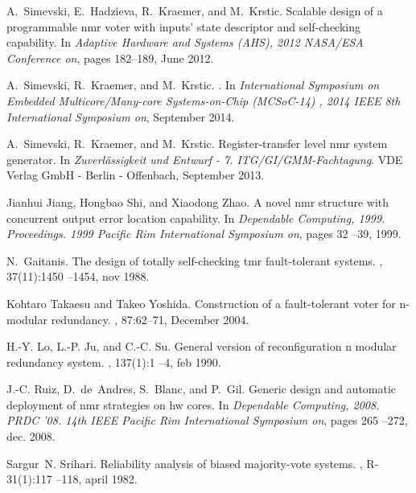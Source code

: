 \documentclass[technote, a4paper, onecolumn]{IEEEtran}  \newcommand{\avtor}{Aleksandar Simevski}
\begin{document}
\begin{thebibliography}{10}

A.~Simevski, E.~Hadzieva, R.~Kraemer, and M.~Krstic.
\newblock Scalable design of a programmable nmr voter with inputs' state
  descriptor and self-checking capability.
\newblock In {\em Adaptive Hardware and Systems (AHS), 2012 NASA/ESA Conference
  on}, pages 182--189, June 2012.

A.~Simevski, R.~Kraemer, and M.~Krstic.
.
\newblock In {\em International Symposium on Embedded Multicore/Many-core
  Systems-on-Chip (MCSoC-14) , 2014 IEEE 8th International Symposium on},
  September 2014.

A.~Simevski, R.~Kraemer, and M.~Krstic.
\newblock Register-transfer level nmr system generator.
\newblock In {\em Zuverlässigkeit und Entwurf - 7. ITG/GI/GMM-Fachtagung}. VDE
  Verlag GmbH - Berlin - Offenbach, September 2013.

Jianhui Jiang, Hongbao Shi, and Xiaodong Zhao.
\newblock A novel nmr structure with concurrent output error location
  capability.
\newblock In {\em Dependable Computing, 1999. Proceedings. 1999 Pacific Rim
  International Symposium on}, pages 32 --39, 1999.

N.~Gaitanis.
\newblock The design of totally self-checking tmr fault-tolerant systems.
, 37(11):1450 --1454, nov 1988.

Kohtaro Takaesu and Takeo Yoshida.
\newblock Construction of a fault-tolerant voter for n-modular redundancy.
,
  87:62–71, December 2004.

H.-Y. Lo, L.-P. Ju, and C.-C. Su.
\newblock General version of reconfiguration n modular redundancy system.
, 137(1):1 --4,
  feb 1990.

J.-C. Ruiz, D.~de~Andres, S.~Blanc, and P.~Gil.
\newblock Generic design and automatic deployment of nmr strategies on hw
  cores.
\newblock In {\em Dependable Computing, 2008. PRDC '08. 14th IEEE Pacific Rim
  International Symposium on}, pages 265 --272, dec. 2008.

Sargur~N. Srihari.
\newblock Reliability analysis of biased majority-vote systems.
, R-31(1):117 --118, april
  1982.


\end{thebibliography}
\end{document}
